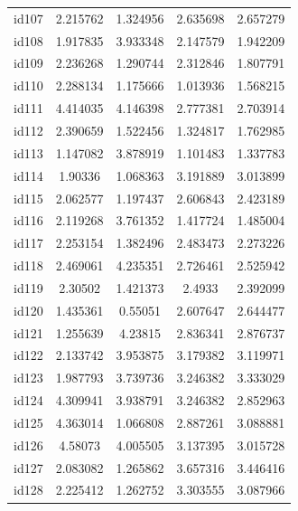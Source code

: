\documentclass[entropy,article,submit,moreauthors,LaTeX and dvi2pdf]{Definitions/mdpi}
\begin{document}
\begin{center}
\begin{longtable}{ccccc}
id107     & 2.215762  & 1.324956       & 2.635698          & 2.657279          \\
id108     & 1.917835  & 3.933348       & 2.147579          & 1.942209          \\
id109     & 2.236268  & 1.290744       & 2.312846          & 1.807791          \\
id110     & 2.288134  & 1.175666       & 1.013936          & 1.568215          \\
id111     & 4.414035  & 4.146398       & 2.777381          & 2.703914          \\
id112     & 2.390659  & 1.522456       & 1.324817          & 1.762985          \\
id113     & 1.147082  & 3.878919       & 1.101483          & 1.337783          \\
id114     & 1.90336   & 1.068363       & 3.191889          & 3.013899          \\
id115     & 2.062577  & 1.197437       & 2.606843          & 2.423189          \\
id116     & 2.119268  & 3.761352       & 1.417724          & 1.485004          \\
id117     & 2.253154  & 1.382496       & 2.483473          & 2.273226          \\
id118     & 2.469061  & 4.235351       & 2.726461          & 2.525942          \\
id119     & 2.30502   & 1.421373       & 2.4933            & 2.392099          \\
id120     & 1.435361  & 0.55051        & 2.607647          & 2.644477          \\
id121     & 1.255639  & 4.23815        & 2.836341          & 2.876737          \\
id122     & 2.133742  & 3.953875       & 3.179382          & 3.119971          \\
id123     & 1.987793  & 3.739736       & 3.246382          & 3.333029          \\
id124     & 4.309941  & 3.938791       & 3.246382          & 2.852963          \\
id125     & 4.363014  & 1.066808       & 2.887261          & 3.088881          \\
id126     & 4.58073   & 4.005505       & 3.137395          & 3.015728          \\
id127     & 2.083082  & 1.265862       & 3.657316          & 3.446416          \\
id128     & 2.225412  & 1.262752       & 3.303555          & 3.087966          \\

\end{longtable}
\end{center}
\end{document}
